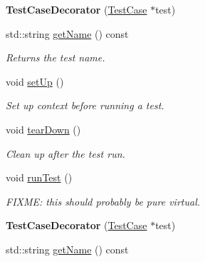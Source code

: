 \begin{DoxyCompactItemize}
\item 
\hypertarget{class_test_case_decorator_a52426cae8665f0a82cda0392bd120fda}{{\bfseries Test\+Case\+Decorator} (\hyperlink{class_test_case}{Test\+Case} $\ast$test)}\label{class_test_case_decorator_a52426cae8665f0a82cda0392bd120fda}

\item 
std\+::string \hyperlink{class_test_case_decorator_a5214bb812414958d39f084e09c8af207}{get\+Name} () const 
\begin{DoxyCompactList}\small\item\em Returns the test name. \end{DoxyCompactList}\item 
\hypertarget{class_test_case_decorator_ae379c8f3e6d411d8a5da57094c08a623}{void \hyperlink{class_test_case_decorator_ae379c8f3e6d411d8a5da57094c08a623}{set\+Up} ()}\label{class_test_case_decorator_ae379c8f3e6d411d8a5da57094c08a623}

\begin{DoxyCompactList}\small\item\em Set up context before running a test. \end{DoxyCompactList}\item 
\hypertarget{class_test_case_decorator_adc3ee82fb758f39b5781624090af449d}{void \hyperlink{class_test_case_decorator_adc3ee82fb758f39b5781624090af449d}{tear\+Down} ()}\label{class_test_case_decorator_adc3ee82fb758f39b5781624090af449d}

\begin{DoxyCompactList}\small\item\em Clean up after the test run. \end{DoxyCompactList}\item 
void \hyperlink{class_test_case_decorator_ad083ca55ff2e7f1f3f442364aa1dde66}{run\+Test} ()
\begin{DoxyCompactList}\small\item\em F\+I\+X\+M\+E\+: this should probably be pure virtual. \end{DoxyCompactList}\item 
\hypertarget{class_test_case_decorator_ad324bf1dd0d660bae3eb5be8056e49e2}{{\bfseries Test\+Case\+Decorator} (\hyperlink{class_test_case}{Test\+Case} $\ast$test)}\label{class_test_case_decorator_ad324bf1dd0d660bae3eb5be8056e49e2}

\item 
\hypertarget{class_test_case_decorator_a5214bb812414958d39f084e09c8af207}{std\+::string \hyperlink{class_test_case_decorator_a5214bb812414958d39f084e09c8af207}{get\+Name} () const }\label{class_test_case_decorator_a5214bb812414958d39f084e09c8af207}


\end{DoxyCompactItemize}
